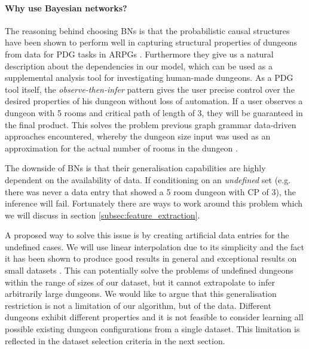 \documentclass{UoYCSproject}
\begin{document}
\paragraph{Why use Bayesian networks?}
The reasoning behind choosing BNs is that the probabilistic causal structures have been shown to perform well in capturing structural properties of dungeons from data for PDG tasks in ARPGs \parencite{SummervilleLearningOfZelda,SummervilleSamplingHyrule}. Furthermore they give us a natural description about the dependencies in our model, which can be used as a supplemental analysis tool for investigating human-made dungeons. As a PDG tool itself, the \textit{observe-then-infer} pattern gives the user precise control over the desired properties of his dungeon without loss of automation. If a user observes a dungeon with 5 rooms and critical path of length of 3, they will be guaranteed in the final product. This solves the problem previous graph grammar data-driven approaches encountered, whereby the dungeon size input was used as an approximation for the actual number of rooms in the dungeon \parencite{Deery}.

The downside of BNs is that their generalisation capabilities are highly dependent on the availability of data. If conditioning on an \textit{undefined} set (e.g. there was never a data entry that showed a 5 room dungeon with CP of 3), the inference will fail. Fortunately there are ways to work around this problem which we will discuss in section \ref{subsec:feature_extraction}.

A proposed way to solve this issue is by creating artificial data entries for the undefined cases. We will use linear interpolation due to its simplicity and the fact it has been shown to produce good results in general \parencite{Ibargengoytia2013OnTE} and exceptional results on small datasets \parencite{yu2004advances}. This can potentially solve the problems of undefined dungeons within the range of sizes of our dataset, but it cannot extrapolate to infer arbitrarily large dungeons. We would like to argue that this generalisation restriction is not a limitation of our algorithm, but of the data. Different dungeons exhibit different properties and it is not feasible to consider learning all possible existing dungeon configurations from a single dataset. This limitation is reflected in the dataset selection criteria in the next section.
\end{document}
